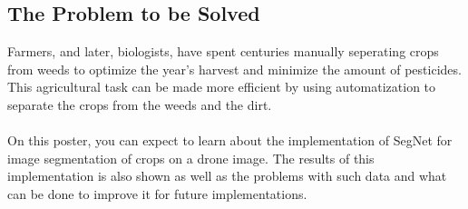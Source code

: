 \documentclass[
    ,title     = {{Image Segmentation for Smart Agriculture}}
    ,subject   = {{This is the subject of my work}}
    ,papersize = {{a1paper}}
    ,nocrop
]{dtuposter}
\begin{document}
%
%
\begin{dtuposterhead} %
\end{dtuposterhead}
%
%
\begin{dtupostercontent}
\section{The Problem to be Solved}

Farmers, and later, biologists, have spent centuries manually seperating crops from weeds to optimize the year's harvest and minimize the amount of pesticides. This agricultural task can be made more efficient by using automatization to separate the crops from the weeds and the dirt.
\\
\\
\indent On this poster, you can expect to learn about the implementation of SegNet for  image segmentation of crops on a drone image. The results of this implementation is also shown as well as the problems with such data and what can be done to improve it for future implementations.
 

\end{dtupostercontent}
\end{document}
